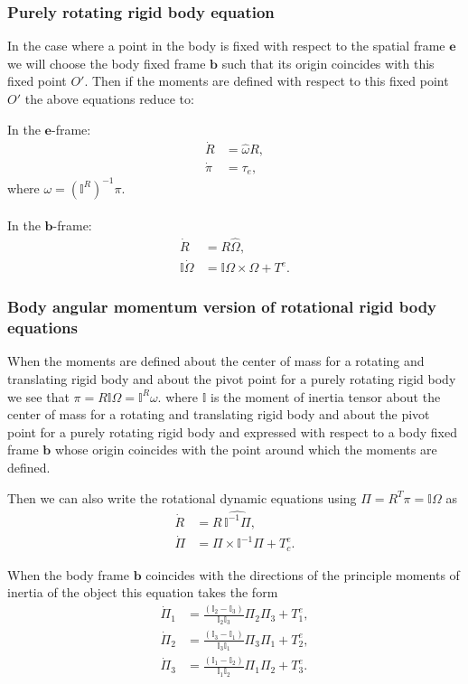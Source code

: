 \documentclass[graybox,envcountchap,sectrefs]{svmonoMuga}
\begin{document}
\subsubsection{Purely rotating rigid body equation}
In the case where a point in the body is fixed with respect to the spatial frame $\mathbf{e}$ we will choose the body fixed frame $\mathbf{b}$ such that its origin coincides with this fixed point $O'$. Then if the moments are defined with respect to this fixed point $O'$ the above equations reduce to:
\begin{svgraybox}
In the $\mathbf{e}$-frame:
\begin{align*}
\dot{R}&=\widehat{\omega}R,\\
\dot{\pi}&=\tau_e,
\end{align*} 
where $\omega =(\mathbb{I}^R)^{-1}\pi$.
\\
\mbox{}
\\
In the $\mathbf{b}$-frame:
\begin{align*}
\dot{R}&=R\widehat{\Omega},\\
\mathbb{I}\dot{\Omega}&=\mathbb{I}\Omega \times {\Omega}+T^e.
\end{align*}
\end{svgraybox}

\subsubsection{Body angular momentum version of rotational rigid body equations}
When the moments are defined about the center of mass for a rotating and translating rigid body and about the pivot point for a purely rotating rigid body we see that $\pi=R\mathbb{I}\Omega=\mathbb{I}^R\omega$.
where $\mathbb{I}$ is the moment of inertia tensor about the center of mass for a rotating and translating rigid body and about the pivot point for a purely rotating rigid body and expressed with respect to a body fixed frame $\mathbf{b}$ whose origin coincides with the point around which the moments are defined.

Then we can also write the rotational dynamic equations using $\Pi=R^T\pi=\mathbb{I}\Omega$ as 
\begin{align*}
\dot{R}&=R\,\widehat{\mathbb{I}^{-1}\Pi},\\
\dot{\Pi}&=\Pi \times {\mathbb{I}^{-1}\Pi}+T^e_c.
\end{align*}


When the body frame $\mathbf{b}$ coincides with the directions of the principle moments of inertia of the object this equation takes the form
\begin{align}
\dot{\Pi}_1 & =  \frac{(\mathbb{I}_2-\mathbb{I}_3)}{\mathbb{I}_2 \mathbb{I}_3}\Pi_2 \Pi_3+ T_1^e, \label{eq:AxiSym1PiFree}\\
\dot{\Pi}_2 & =  \frac{(\mathbb{I}_3-\mathbb{I}_1)}{\mathbb{I}_3 \mathbb{I}_1}\Pi_3 \Pi_1+ T_2^e, \label{eq:AxiSym2PiFree}\\
\dot{\Pi}_3 & =  \frac{(\mathbb{I}_1-\mathbb{I}_2)}{\mathbb{I}_1 \mathbb{I}_2}\Pi_1 \Pi_2+ T_3^e. \label{eq:AxiSym3PiFree}
\end{align}
\end{document}
